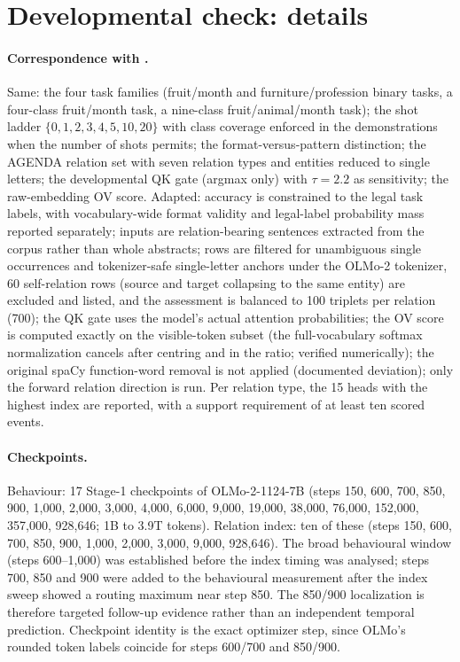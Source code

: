 \section{Developmental check: details}
\label{app:dev}

\paragraph{Correspondence with \citet{ren2024semantic}.}
Same: the four task families (fruit/month and furniture/profession binary tasks, a
four-class fruit/month task, a nine-class fruit/animal/month task); the shot ladder
$\{0,1,2,3,4,5,10,20\}$ with class coverage enforced in the demonstrations when the
number of shots permits; the format-versus-pattern distinction; the AGENDA relation
set with seven relation types and entities reduced to single letters; the
developmental QK gate (argmax only) with $\tau{=}2.2$ as sensitivity; the
raw-embedding OV score. Adapted: accuracy is constrained to the legal task labels,
with vocabulary-wide format validity and legal-label probability mass reported
separately; inputs are relation-bearing sentences extracted from the corpus rather
than whole abstracts; rows are filtered for unambiguous single occurrences and
tokenizer-safe single-letter anchors under the OLMo-2 tokenizer, 60 self-relation
rows (source and target collapsing to the same entity) are excluded and listed, and
the assessment is balanced to 100 triplets per relation (700); the QK gate uses the
model's actual attention probabilities; the OV score is computed exactly on the
visible-token subset (the full-vocabulary softmax normalization cancels after
centring and in the ratio; verified numerically); the original spaCy function-word
removal is not applied (documented deviation); only the forward relation direction
is run. Per relation type, the 15 heads with the highest index are reported, with a
support requirement of at least ten scored events.

\paragraph{Checkpoints.}
Behaviour: 17 Stage-1 checkpoints of OLMo-2-1124-7B (steps 150, 600, 700, 850, 900,
1{,}000, 2{,}000, 3{,}000, 4{,}000, 6{,}000, 9{,}000, 19{,}000, 38{,}000, 76{,}000,
152{,}000, 357{,}000, 928{,}646; 1B to 3.9T tokens). Relation index: ten of these
(steps 150, 600, 700, 850, 900, 1{,}000, 2{,}000, 3{,}000, 9{,}000, 928{,}646).
The broad behavioural window (steps 600--1{,}000) was established before the index
timing was analysed; steps 700, 850 and 900 were added to the behavioural
measurement after the index sweep showed a routing maximum near step 850. The
850/900 localization is therefore targeted follow-up evidence rather than an
independent temporal prediction. Checkpoint identity is the exact optimizer step,
since OLMo's rounded token labels coincide for steps 600/700 and 850/900.

